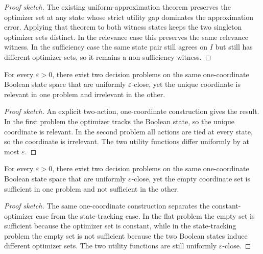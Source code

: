 \begin{proof}[Proof sketch]
The existing uniform-approximation theorem preserves the optimizer set at any state whose strict utility gap dominates the approximation error. Applying that theorem to both witness states keeps the two singleton optimizer sets distinct. In the relevance case this preserves the same relevance witness. In the sufficiency case the same state pair still agrees on $I$ but still has different optimizer sets, so it remains a non-sufficiency witness.
\end{proof}

\begin{corollary}\label{cor:small-uniform-perturbations-can-flip-relevance}
For every $\varepsilon>0$, there exist two decision problems on the same one-coordinate Boolean state space that are uniformly $\varepsilon$-close, yet the unique coordinate is relevant in one problem and irrelevant in the other.
\end{corollary}

\begin{proof}[Proof sketch]
An explicit two-action, one-coordinate construction gives the result. In the first problem the optimizer tracks the Boolean state, so the unique coordinate is relevant. In the second problem all actions are tied at every state, so the coordinate is irrelevant. The two utility functions differ uniformly by at most $\varepsilon$.
\end{proof}

\begin{corollary}\label{cor:small-uniform-perturbations-can-flip-sufficiency}
For every $\varepsilon>0$, there exist two decision problems on the same one-coordinate Boolean state space that are uniformly $\varepsilon$-close, yet the empty coordinate set is sufficient in one problem and not sufficient in the other.
\end{corollary}

\begin{proof}[Proof sketch]
The same one-coordinate construction separates the constant-optimizer case from the state-tracking case. In the flat problem the empty set is sufficient because the optimizer set is constant, while in the state-tracking problem the empty set is not sufficient because the two Boolean states induce different optimizer sets. The two utility functions are still uniformly $\varepsilon$-close.
\end{proof}

